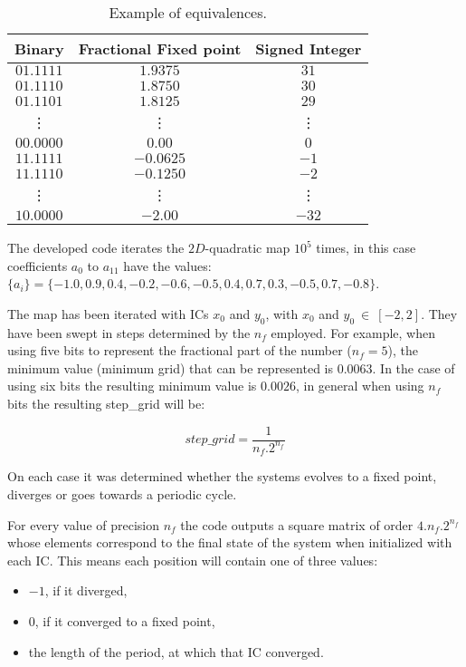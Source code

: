 \begin{table}[h]
  \caption{Example of equivalences.}\label{tab:tabla}
  \vspace{2mm}
  \centering
  \begin{tabular}{ c c c  }
  \hline
  Binary  & Fractional Fixed point & Signed Integer  \\
  \hline
   \hline
  $01.1111$ & $1.9375$ & $31$ \\
  $01.1110$ & $1.8750$ & $30$ \\
  $01.1101$ & $1.8125$ & $29$ \\
   \vdots & \vdots &  \vdots\\
  $00.0000$ & $0.00$ & $0$  \\
  $11.1111$ & $-0.0625$ & $-1$ \\
  $11.1110$ & $-0.1250$ & $-2$  \\
   \vdots & \vdots & \vdots \\
    $10.0000$ &  $-2.00$ & $-32$  \\
    \hline
    \end{tabular}
\end{table}

The developed code iterates the $2D$-quadratic map $10^5$ times, in this case coefficients $a_0$ to $a_{11}$ have the values:\\
$\{a_i\}=\{-1.0, 0.9, 0.4, -0.2, -0.6, -0.5, 0.4, 0.7, 0.3, -0.5, 0.7,-0.8\}$. 

The map has been iterated with ICs $x_0$ and $y_0$, with $x_0$ and $y_0~\in~[-2,2]$. They have been swept in steps determined by the $n_f$ employed.
For example, when using five bits to represent the fractional part of the number ($n_f=5$), the minimum value (minimum grid) that can be represented is $0.0063$. In the case of using six bits the resulting minimum value is $0.0026$, in general when using $n_f$ bits the resulting step\_grid will be:

\begin{equation}
step\_grid=\frac{1}{n_f.2^{n_f}}
\end{equation}

On each case it was determined whether the
systems evolves to a fixed point, diverges or goes towards a
periodic cycle.

For every value of precision $n_f$ the code outputs a square matrix of order $4.n_f.2^{n_f}$ whose elements correspond to the final state of the system when initialized with each
IC. This means each position will contain one of three values:
\begin{itemize}
\item $-1$, if it diverged,
\item $0$, if it converged to a fixed point, 
\item the length of the period, at which that IC converged.
\end {itemize}

